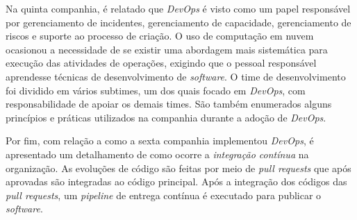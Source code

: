 Na quinta companhia, é relatado que \textit{DevOps} é visto como
um papel responsável por gerenciamento de incidentes, gerenciamento de
capacidade, gerenciamento de riscos e suporte ao processo de criação.
O uso de computação em nuvem ocasionou a necessidade de se existir uma
abordagem mais sistemática para execução das atividades de operações, exigindo
que o pessoal responsável aprendesse técnicas de desenvolvimento de
\textit{software}. O time de desenvolvimento foi dividido em vários subtimes,
um dos quais focado em \textit{DevOps}, com responsabilidade de apoiar os demais
times. São também enumerados alguns princípios e práticas utilizados na companhia
durante a adoção de \textit{DevOps}.

Por fim, com relação a como a sexta companhia implementou \textit{DevOps},
é apresentado um detalhamento de como ocorre a \emph{integração contínua} na
organização. As evoluções de código são feitas por meio de \textit{pull
requests} que após aprovadas são integradas ao código principal. Após a
integração dos códigos das \textit{pull requests}, um \textit{pipeline} de entrega
contínua é executado para publicar o \textit{software}.
\fi
